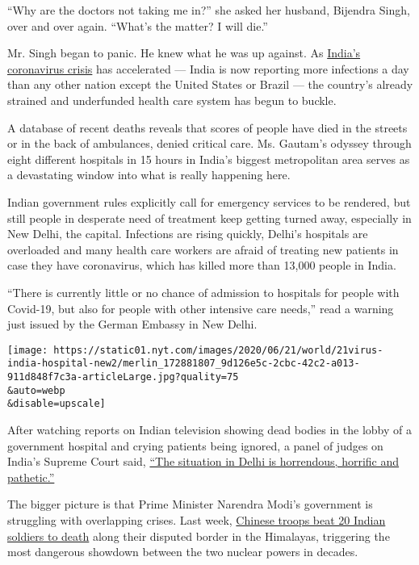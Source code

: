 ``Why are the doctors not taking me in?'' she asked her husband,
Bijendra Singh, over and over again. ``What's the matter? I will die.''

Mr. Singh began to panic. He knew what he was up against. As
\href{https://www.nytimes.com/2020/07/02/world/asia/india-coronavirus-wedding-groom.html}{India's
coronavirus crisis} has accelerated --- India is now reporting more
infections a day than any other nation except the United States or
Brazil --- the country's already strained and underfunded health care
system has begun to buckle.

A database of recent deaths reveals that scores of people have died in
the streets or in the back of ambulances, denied critical care. Ms.
Gautam's odyssey through eight different hospitals in 15 hours in
India's biggest metropolitan area serves as a devastating window into
what is really happening here.

Indian government rules explicitly call for emergency services to be
rendered, but still people in desperate need of treatment keep getting
turned away, especially in New Delhi, the capital. Infections are rising
quickly, Delhi's hospitals are overloaded and many health care workers
are afraid of treating new patients in case they have coronavirus, which
has killed more than 13,000 people in India.

``There is currently little or no chance of admission to hospitals for
people with Covid-19, but also for people with other intensive care
needs,'' read a warning just issued by the German Embassy in New Delhi.

\texttt{[image: https://static01.nyt.com/images/2020/06/21/world/21virus-india-hospital-new2/merlin\_172881807\_9d126e5c-2cbc-42c2-a013-911d848f7c3a-articleLarge.jpg?quality=75\\\&auto=webp\\\&disable=upscale]}

After watching reports on Indian television showing dead bodies in the
lobby of a government hospital and crying patients being ignored, a
panel of judges on India's Supreme Court said,
\href{https://indianexpress.com/article/india/coronavirus-dead-bodies-delhi-supreme-court-notice-centre-6455474/}{``The
situation in Delhi is horrendous, horrific and pathetic.''}

The bigger picture is that Prime Minister Narendra Modi's government is
struggling with overlapping crises. Last week,
\href{https://www.nytimes.com/2020/06/16/world/asia/indian-china-border-clash.html}{Chinese
troops beat 20 Indian soldiers to death} along their disputed border in
the Himalayas, triggering the most dangerous showdown between the two
nuclear powers in decades.

